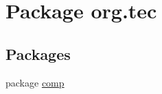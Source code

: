 \hypertarget{namespaceorg_1_1tec}{}\section{Package org.\+tec}
\label{namespaceorg_1_1tec}
\subsection*{Packages}
\begin{DoxyCompactItemize}
\item 
package \mbox{\hyperlink{namespaceorg_1_1tec_1_1comp}{comp}}
\end{DoxyCompactItemize}
